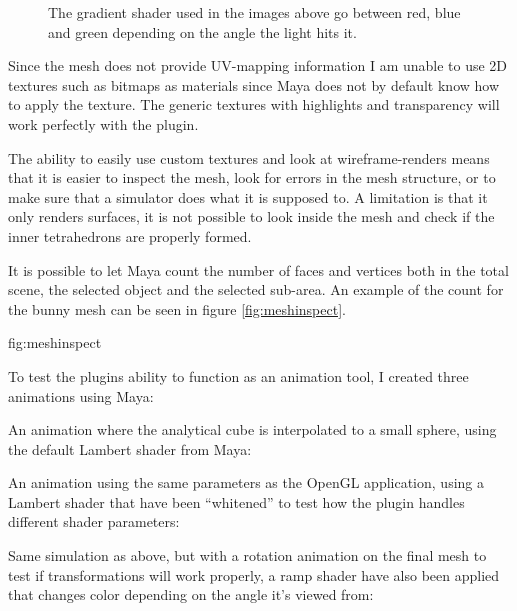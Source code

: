 \begin{figure}
        \caption{The gradient shader used in the images above go between red,
                 blue and green depending on the angle the light hits it.}
        \label{fig:gradients}
\end{figure}

Since the mesh does not provide UV-mapping information I am unable to use 2D
textures such as bitmaps as materials since Maya does not by default know how to
apply the texture. The generic textures with highlights and transparency
will work perfectly with the plugin.

The ability to easily use custom textures and look at wireframe-renders means
that it is easier to inspect the mesh, look for errors in the mesh structure,
or to make sure that a simulator does what it is supposed to. A limitation is
that it only renders surfaces, it is not possible to look inside the mesh and
check if the inner tetrahedrons are properly formed.

It is possible to let Maya count the number of faces and vertices both in the
total scene, the selected object and the selected sub-area. An example of the
count for the bunny mesh can be seen in figure \ref{fig:meshinspect}.

          {fig:meshinspect}

To test the plugins ability to function as an animation tool, I created
three animations using Maya:
\begin{itemize*}
  \item An animation where the analytical cube is interpolated to a small
    sphere, using the default Lambert shader from Maya:

  \item An animation using the same parameters as the OpenGL application, using
    a Lambert shader that have been ``whitened'' to test how the plugin handles
    different shader parameters:

  \item Same simulation as above, but with a rotation animation on the final
    mesh to test if transformations will work properly, a ramp shader have also
    been applied that changes color depending on the angle it's viewed from:
\end{itemize*}

